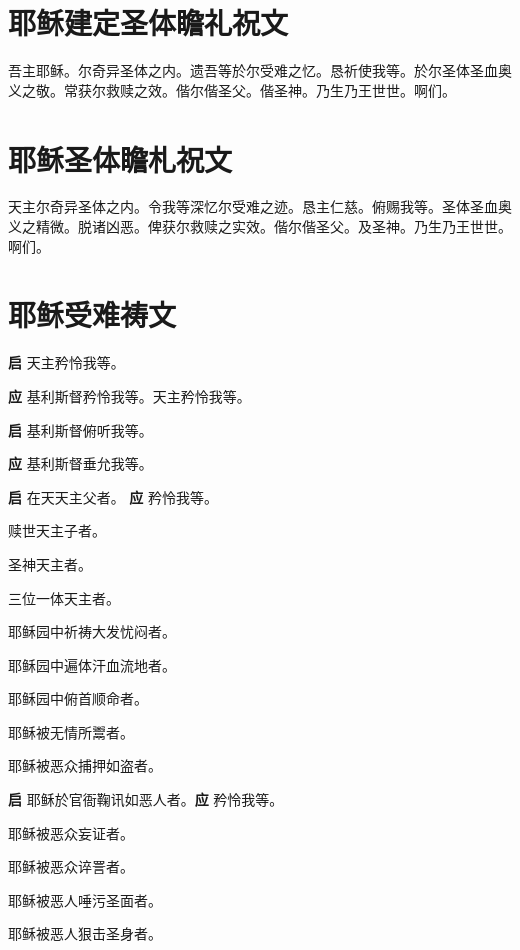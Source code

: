 \documentclass[UTF8,17pt]{ctexart}
\begin{document}
\section{耶稣建定圣体瞻礼祝⽂}

吾主耶稣。尔奇异圣体之内。遗吾等於尔受难之忆。恳祈使我等。於尔圣体圣⾎奥义之敬。常获尔救赎之效。偕尔偕圣⽗。偕圣神。乃⽣乃王世世。啊们。

\section{耶稣圣体瞻札祝⽂}

天主尔奇异圣体之内。令我等深忆尔受难之迹。恳主仁慈。俯赐我等。圣体圣⾎奥义之精微。脱诸凶恶。俾获尔救赎之实效。偕尔偕圣父。及圣神。乃生乃王世世。啊们。

\section{耶稣受难祷⽂}

\textbf{启} \quad 天主矜怜我等。

\textbf{应} \quad 基利斯督矜怜我等。天主矜怜我等。

\textbf{启} \quad 基利斯督俯听我等。

\textbf{应} \quad 基利斯督垂允我等。

\textbf{启} \quad 在天天主⽗者。 \hfill \textbf{应} \quad 矜怜我等。

 赎世天主⼦者。

 圣神天主者。

 三位⼀体天主者。

 耶稣园中祈祷⼤发忧闷者。

 耶稣园中遍体汗⾎流地者。

 耶稣园中俯⾸顺命者。

 耶稣被⽆情所鬻者。

 耶稣被恶众捕押如盗者。

\textbf{启} \quad 耶稣於官衙鞠讯如恶⼈者。\hfill \textbf{应} \quad 矜怜我等。

 耶稣被恶众妄证者。

 耶稣被恶众谇詈者。

 耶稣被恶⼈唾污圣⾯者。

 耶稣被恶⼈狠击圣⾝者。
\end{document}
